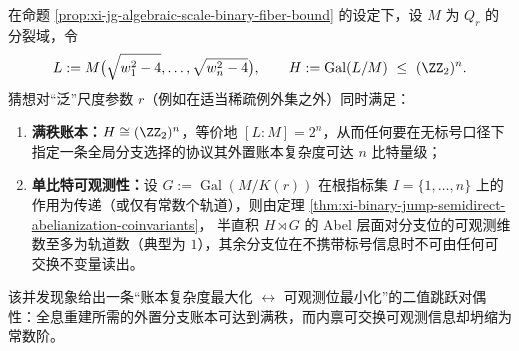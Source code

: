 \begin{conjecture}[输运分支的满秩账本与单比特可观测性的并发]\label{conj:xi-jg-branch-ledger-fullrank-vs-coinvariant-collapse}
在命题 \ref{prop:xi-jg-algebraic-scale-binary-fiber-bound} 的设定下，设 \(M\) 为 \(Q_r\) 的分裂域，令
\[
L:=M\bigl(\sqrt{w_1^2-4},\dots,\sqrt{w_n^2-4}\bigr),
\qquad
H:=\operatorname{Gal}(L/M)\ \le\ (\ZZ_2)^n.
\]
猜想对“泛”尺度参数 \(r\)（例如在适当稀疏例外集之外）同时满足：
\begin{enumerate}
\normalfont
  \item \textbf{满秩账本：}\(H\cong(\ZZ_2)^n\)，等价地 \([L:M]=2^n\)，从而任何要在无标号口径下指定一条全局分支选择的协议其外置账本复杂度可达 \(n\) 比特量级；
  \item \textbf{单比特可观测性：}设 \(G:=\operatorname{Gal}(M/K(r))\) 在根指标集 \(I=\{1,\dots,n\}\) 上的作用为传递（或仅有常数个轨道），则由定理 \ref{thm:xi-binary-jump-semidirect-abelianization-coinvariants}，
  半直积 \(H\rtimes G\) 的 Abel 层面对分支位的可观测维数至多为轨道数（典型为 \(1\)），其余分支位在不携带标号信息时不可由任何可交换不变量读出。
\end{enumerate}
该并发现象给出一条“账本复杂度最大化 \(\leftrightarrow\) 可观测位最小化”的二值跳跃对偶性：全息重建所需的外置分支账本可达到满秩，而内禀可交换可观测信息却坍缩为常数阶。
\end{conjecture}
